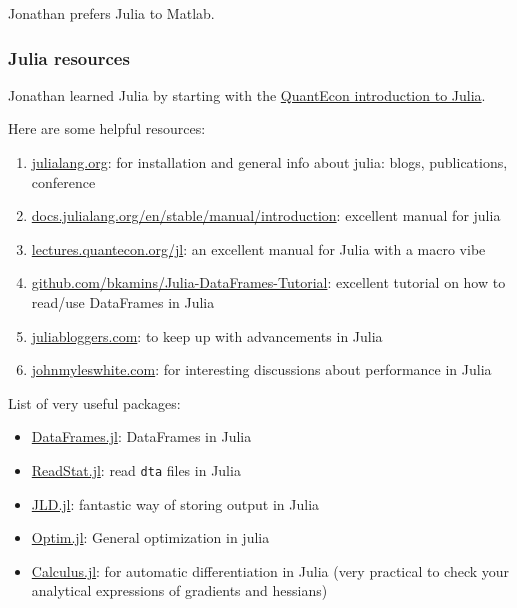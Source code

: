 Jonathan prefers Julia to Matlab.

\subsubsection{Julia resources}
Jonathan learned Julia by starting with the \href{https://lectures.quantecon.org/jl/index_learning_julia.html}{QuantEcon introduction to Julia}.

Here are some helpful resources:
\begin{enumerate}
\item \href{https://julialang.org}{julialang.org}: for installation and general info about julia: blogs, publications, conference
\item \href{https://docs.julialang.org/en/stable/manual/introduction/}{docs.julialang.org/en/stable/manual/introduction}: excellent manual for julia
\item \href{https://lectures.quantecon.org/jl/}{lectures.quantecon.org/jl}: an excellent manual for Julia with a macro vibe
\item \href{https://github.com/bkamins/Julia-DataFrames-Tutorial}{github.com/bkamins/Julia-DataFrames-Tutorial}: excellent tutorial on how to read/use DataFrames in Julia
\item \href{https://www.juliabloggers.com/}{juliabloggers.com}: to keep up with advancements in Julia
\item \href{http://www.johnmyleswhite.com/}{johnmyleswhite.com}: for interesting discussions about performance in Julia 
\end{enumerate}

List of very useful packages:
\begin{itemize}
\item \href{https://github.com/JuliaData/DataFrames.jl}{DataFrames.jl}: DataFrames in Julia
\item \href{https://github.com/davidanthoff/ReadStat.jl}{ReadStat.jl}: read \texttt{dta} files in Julia
\item \href{https://github.com/JuliaIO/JLD.jl}{JLD.jl}: fantastic way of storing output in Julia
\item \href{https://github.com/JuliaNLSolvers/Optim.jl}{Optim.jl}: General optimization in julia
\item \href{https://github.com/johnmyleswhite/Calculus.jl}{Calculus.jl}: for automatic differentiation in Julia (very practical to check your analytical expressions of gradients and hessians)
\end{itemize}

